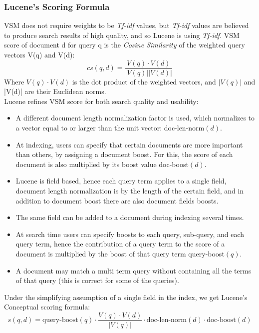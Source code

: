 \subsubsection*{Lucene's Scoring Formula}
VSM does not require weights to be \textit{Tf-idf} values, but \textit{Tf-idf }values are believed to produce search results of high quality, and so Lucene is using \textit{Tf-idf}. VSM score of document d for query q is the \textit{Cosine Similarity }of the weighted query vectors V(q) and V(d): 
\begin{equation}\label{eq:cosine-sim}
    cs(q, d) = \frac{V(q) \cdot V(d)}{|V(q)| |V(d)|} 
\end{equation}
Where $V(q) \cdot V(d)$ is the dot product of the weighted vectors, and $|V(q)|$ and |V(d)| are their Euclidean norms. \\
Lucene refines VSM score for both search quality and usability: 
\begin{itemize}
    \item A different document length normalization factor is used, which normalizes to a vector equal to or larger than the unit vector: doc-len-norm$(d)$.
    \item At indexing, users can specify that certain documents are more important than others, by assigning a document boost. For this, the score of each document is also multiplied by its boost value doc-boost$(d)$. 
    \item Lucene is field based, hence each query term applies to a single field, document length normalization is by the length of the certain field, and in addition to document boost there are also document fields boosts.
    \item The same field can be added to a document during indexing several times.
    \item At search time users can specify boosts to each query, sub-query, and each query term, hence the contribution of a query term to the score of a document is multiplied by the boost of that query term query-boost$(q)$.
    \item A document may match a multi term query without containing all the terms of that query (this is correct for some of the queries). 
\end{itemize}
Under the simplifying assumption of a single field in the index, we get Lucene's Conceptual scoring formula: 
\begin{equation}\label{eq:lucene-sim}
    s(q, d) = \text{query-boost}(q) \cdot \frac{V(q) \cdot V(d)}{|V(q)|} \cdot \text{doc-len-norm}(d) \cdot \text{doc-boost}(d)
\end{equation}

